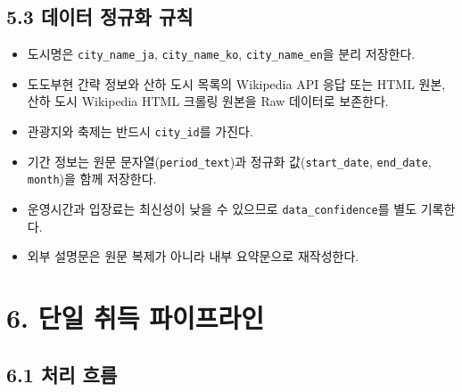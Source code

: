 \documentclass[12pt,a4paper]{article}
\newcommand{\DocNeedspace}[1]{\par\ifdim\dimexpr\pagegoal-\pagetotal\relax<#1\newpage\fi}
\begin{document}
\DocNeedspace{24\baselineskip}
\subsection*{5.3 데이터 정규화 규칙}


\begin{itemize}
\item 도시명은 \texttt{city\_\allowbreak{}name\_\allowbreak{}ja}, \texttt{city\_\allowbreak{}name\_\allowbreak{}ko}, \texttt{city\_\allowbreak{}name\_\allowbreak{}en}을 분리 저장한다.
\item 도도부현 간략 정보와 산하 도시 목록의 Wikipedia API 응답 또는 HTML 원본, 산하 도시 Wikipedia HTML 크롤링 원본을 Raw 데이터로 보존한다.
\item 관광지와 축제는 반드시 \texttt{city\_\allowbreak{}id}를 가진다.
\item 기간 정보는 원문 문자열(\texttt{period\_\allowbreak{}text})과 정규화 값(\texttt{start\_\allowbreak{}date}, \texttt{end\_\allowbreak{}date}, \texttt{month})을 함께 저장한다.
\item 운영시간과 입장료는 최신성이 낮을 수 있으므로 \texttt{data\_\allowbreak{}confidence}를 별도 기록한다.
\item 외부 설명문은 원문 복제가 아니라 내부 요약문으로 재작성한다.
\end{itemize}


\newpage

\DocNeedspace{10\baselineskip}
\section*{6. 단일 취득 파이프라인}


\DocNeedspace{8\baselineskip}
\subsection*{6.1 처리 흐름}
\end{document}
